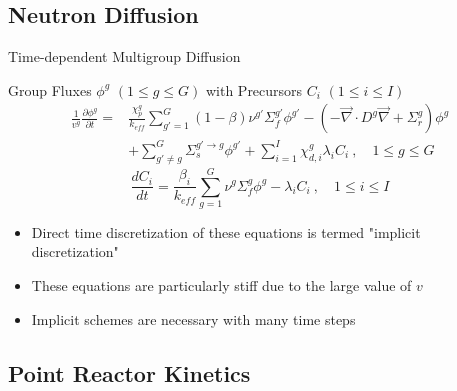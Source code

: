 \documentclass[8pt,xcolor=dvipnames]{beamer}
\renewcommand{\div}{\vec{\nabla}\! \cdot \!}
\newcommand{\grad}{\vec{\nabla}}
\newcommand{\be}{\begin{equation*}}
\newcommand{\ee}{\end{equation*}}
\newcommand{\keff}{\ensuremath{k_{\textit{eff}}}}
\begin{document}
\subsection{Neutron Diffusion}

\begin{frame}{Time-dependent Multigroup Diffusion}

\vspace{-3mm}

\begin{block}{Group Fluxes $\phi^g$ $(1 \le g \le G )$ with Precursors $C_i$ $(1 \le i \le I)$}
\begin{align*}
\frac{1}{v^g} \frac{\partial \phi^g }{\partial t} =& \frac{\chi_p^g}{\keff} \sum_{g'=1}^G (1-\beta) \nu^{g'} \Sigma_f^{g'} \phi^{g'} -  \left( -\div D^g \grad  + \Sigma_r^g \right) \phi^g  \nonumber \\
&  + \sum_{g'\neq g}^G\Sigma_s^{g'\to g} \phi^{g'}  + \sum_{i=1}^I\chi_{d,i}^g\lambda_i C_i \ , \quad 1 \le g \le G 
\end{align*}
\be
\frac{dC_i}{dt} = \frac{\beta_i}{k_{eff}}\sum_{g=1}^G\nu^{g} \Sigma_f^g \phi^{g} - \lambda_i C_i \ , \quad 1 \le i \le I 
\ee
\end{block}

\begin{block}{}
\begin{itemize}
\item Direct time discretization of these equations is termed "implicit discretization"
\item These equations are particularly stiff due to the large value of $v$
\item Implicit schemes are necessary with many time steps
\end{itemize}
\end{block}

\end{frame}

\subsection{Point Reactor Kinetics}
\end{document}
